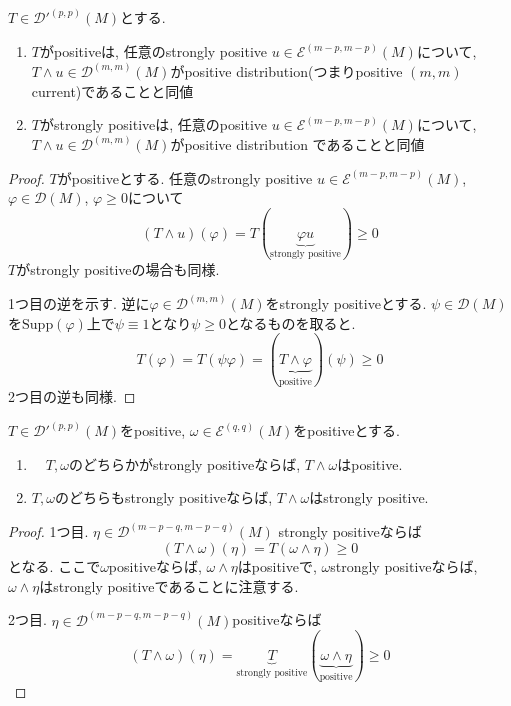 \begin{tcolorbox}[mybox]
\begin{lem}
\label{lem-M-7.4.6}
$T \in {\mathcal{D}'}^{(p,p)}(M)$とする. 
\begin{enumerate}
\item $T$がpositiveは, 任意のstrongly positive $u \in {\mathcal{E}}^{(m-p,m-p)}(M)$について, 
$T \wedge u \in {\mathcal{D}}^{(m,m)}(M)$がpositive distribution(つまりpositive $(m, m)$ current)であることと同値
\item $T$がstrongly positiveは, 任意のpositive $u \in {\mathcal{E}}^{(m-p,m-p)}(M)$について, 
$T \wedge u \in {\mathcal{D}}^{(m,m)}(M)$がpositive distribution
であることと同値
\end{enumerate}
\end{lem}
\end{tcolorbox}
\begin{proof}
$T$がpositiveとする. 
 任意のstrongly positive $u \in {\mathcal{E}}^{(m-p,m-p)}(M)$, $\varphi \in {\mathcal{D}}(M)$, $\varphi \ge 0$について
 $$
 (T \wedge u)(\varphi)
 =T(\underbrace{\varphi u}_{\text{strongly positive}})
 \ge 0
 $$
 $T$がstrongly positiveの場合も同様.
 
 1つ目の逆を示す. 
 逆に$\varphi \in {\mathcal{D}}^{(m,m)}(M)$をstrongly positiveとする. 
 $\psi \in {\mathcal{D}}(M)$を$\mathrm{Supp}(\varphi)$上で$\psi \equiv 1$となり$\psi \ge 0$となるものを取ると. 
 $$
 T(\varphi)
 =T(\psi \varphi)
 =(\underbrace{T \wedge \varphi}_{\text{positive}})(\psi)
\ge 0
 $$
 2つ目の逆も同様. 
\end{proof}



\begin{tcolorbox}[mybox]
\begin{lem}
\label{lem-M-7.4.7}
$T \in {\mathcal{D}'}^{(p,p)}(M)$をpositive, 
$\omega \in {\mathcal{E}}^{(q,q)}(M)$をpositiveとする.
\begin{enumerate}
\item　$T, \omega$のどちらかがstrongly positiveならば, $T \wedge \omega$はpositive.
\item $T, \omega$のどちらもstrongly positiveならば, $T \wedge \omega$はstrongly positive.
\end{enumerate}
\end{lem}
\end{tcolorbox}

\begin{proof}
1つ目. $\eta \in  {\mathcal{D}}^{(m-p-q,m-p-q)}(M)$ strongly positiveならば
$$
(T \wedge \omega)(\eta)
=T(\omega \wedge \eta) \ge 0
$$
となる. ここで$\omega$positiveならば, $\omega \wedge \eta$はpositiveで, $\omega$strongly positiveならば, $\omega \wedge \eta$はstrongly positiveであることに注意する. 

2つ目. $\eta \in  {\mathcal{D}}^{(m-p-q,m-p-q)}(M)$positiveならば
$$
(T \wedge \omega)(\eta)
=\underbrace{T}_{\text{strongly positive}}(\underbrace{\omega \wedge \eta}_{\text{positive}}) \ge 0
$$
\end{proof}



